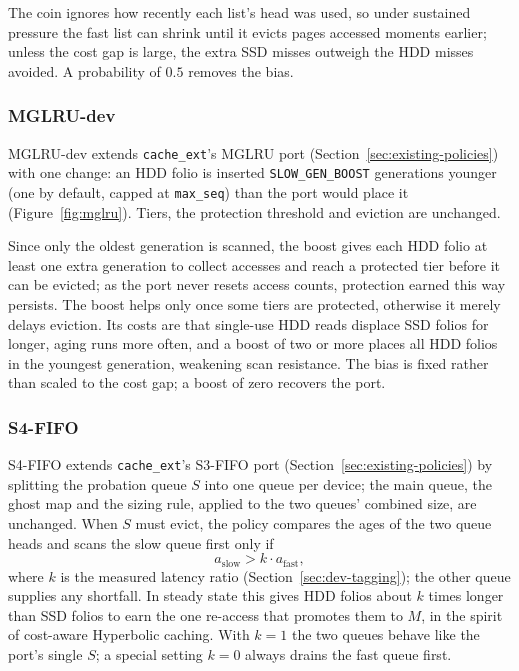 \documentclass[11pt,sigconf,nonacm]{acmart}
\newcommand{\cacheExt}{\texttt{cache\_ext}}
\begin{document}
The coin ignores how recently each list's head was used, so under sustained pressure the fast list can shrink until it evicts pages accessed moments earlier; unless the cost gap is large, the extra SSD misses outweigh the HDD misses avoided. A probability of $0.5$ removes the bias.

\subsubsection{MGLRU-dev}
\label{sec:mglru-dev}

MGLRU-dev extends \cacheExt{}'s MGLRU port (Section~\ref{sec:existing-policies}) with one change: an HDD folio is inserted \texttt{SLOW\_GEN\_BOOST} generations younger (one by default, capped at \texttt{max\_seq}) than the port would place it (Figure~\ref{fig:mglru}). Tiers, the protection threshold and eviction are unchanged.

Since only the oldest generation is scanned, the boost gives each HDD folio at least one extra generation to collect accesses and reach a protected tier before it can be evicted; as the port never resets access counts, protection earned this way persists. The boost helps only once some tiers are protected, otherwise it merely delays eviction. Its costs are that single-use HDD reads displace SSD folios for longer, aging runs more often, and a boost of two or more places all HDD folios in the youngest generation, weakening scan resistance. The bias is fixed rather than scaled to the cost gap; a boost of zero recovers the port.

\subsubsection{S4-FIFO}
\label{sec:s4fifo}

S4-FIFO extends \cacheExt{}'s S3-FIFO port (Section~\ref{sec:existing-policies}) by splitting the probation queue $S$ into one queue per device; the main queue, the ghost map and the sizing rule, applied to the two queues' combined size, are unchanged. When $S$ must evict, the policy compares the ages of the two queue heads and scans the slow queue first only if
\[
a_\text{slow} > k \cdot a_\text{fast},
\]
where $k$ is the measured latency ratio (Section~\ref{sec:dev-tagging}); the other queue supplies any shortfall. In steady state this gives HDD folios about $k$ times longer than SSD folios to earn the one re-access that promotes them to $M$, in the spirit of cost-aware Hyperbolic caching\cite{blankstein2017hyperbolic}. With $k=1$ the two queues behave like the port's single $S$; a special setting $k=0$ always drains the fast queue first.
\end{document}
